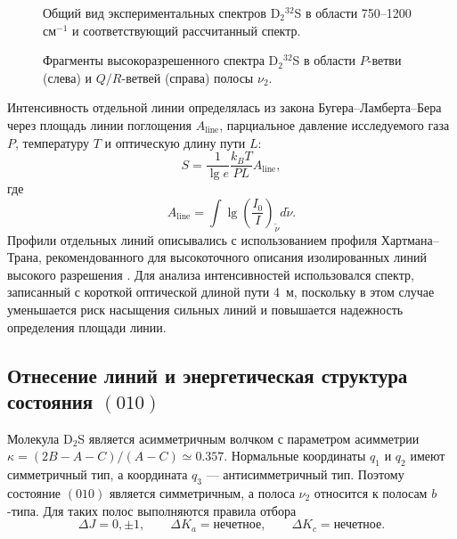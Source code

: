 \begin{figure}[htbp]
    \centering
    \caption{Общий вид экспериментальных спектров D$_2{}^{32}$S в области 750--1200 см$^{-1}$ и
    соответствующий рассчитанный спектр.}
    \label{fig:d2s_overview}
\end{figure}

\begin{figure}[htbp]
    \centering
    \hfill
    \caption{Фрагменты высокоразрешенного спектра D$_2{}^{32}$S в области $P$-ветви (слева) и
    $Q/R$-ветвей (справа) полосы $\nu_2$.}
    \label{fig:d2s_fragments}
\end{figure}

Интенсивность отдельной линии определялась из закона Бугера--Ламберта--Бера через площадь линии
поглощения $A_{\text{line}}$, парциальное давление исследуемого газа $P$, температуру $T$ и оптическую
длину пути $L$:
\begin{equation}
S=\frac{1}{\lg e}\frac{k_B T}{PL}A_{\text{line}},
\label{eq:d2s_beer_lambert}
\end{equation}
где
\begin{equation}
A_{\text{line}}=\int \lg\left(\frac{I_0}{I}\right)_{\widetilde{\nu}}d\widetilde{\nu}.
\label{eq:d2s_line_area}
\end{equation}
Профили отдельных линий описывались с использованием профиля Хартмана--Трана, рекомендованного для
высокоточного описания изолированных линий высокого разрешения \cite{d2s_tennyson2014}. Для анализа
интенсивностей использовался спектр, записанный с короткой оптической длиной пути 4~м, поскольку в
этом случае уменьшается риск насыщения сильных линий и повышается надежность определения площади
линии.

\subsection{Отнесение линий и энергетическая структура состояния $(010)$}

Молекула D$_2$S является асимметричным волчком с параметром асимметрии
$\kappa=(2B-A-C)/(A-C)\simeq0.357$. Нормальные координаты $q_1$ и $q_2$ имеют симметричный тип, а
координата $q_3$ --- антисимметричный тип. Поэтому состояние $(010)$ является симметричным, а полоса
$\nu_2$ относится к полосам $b$-типа. Для таких полос выполняются правила отбора
\begin{equation}
\Delta J=0,\pm1,\qquad \Delta K_a=\text{нечетное},\qquad \Delta K_c=\text{нечетное}.
\label{eq:d2s_selection_rules}
\end{equation}

